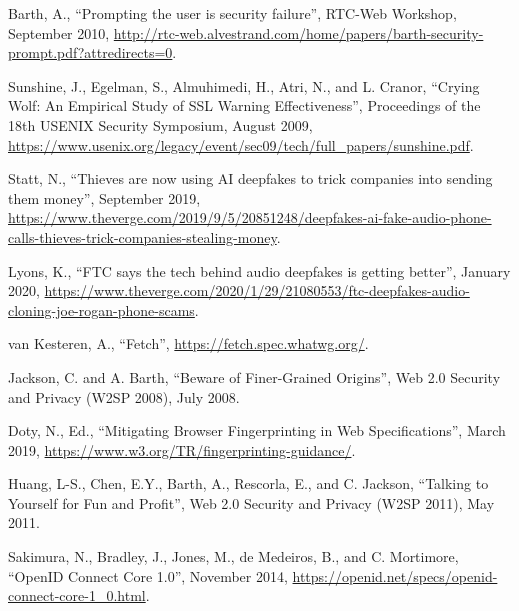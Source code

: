 \documentclass{article}
\begin{document}
\begin{description}[style=nextline, labelwidth=10em, leftmargin=10em]
\item[{[abarth-rtcweb]}] Barth, A., ``Prompting the user is security failure'', RTC-Web
   Workshop, September 2010,
   \url{http://rtc-web.alvestrand.com/home/papers/barth-security-prompt.pdf?attredirects=0}.

\item[{[cranor-wolf]}] Sunshine, J., Egelman, S., Almuhimedi, H., Atri, N., and
   L. Cranor, ``Crying Wolf: An Empirical Study of SSL Warning
   Effectiveness'', Proceedings of the 18th USENIX Security
   Symposium, August 2009,
   \url{https://www.usenix.org/legacy/event/sec09/tech/full_papers/sunshine.pdf}.

\item[{[deepfakes-fraud]}] Statt, N., ``Thieves are now using AI deepfakes to trick
   companies into sending them money'', September 2019,
   \url{https://www.theverge.com/2019/9/5/20851248/deepfakes-ai-fake-audio-phone-calls-thieves-trick-companies-stealing-money}.

\item[{[deepfakes-ftc]}] Lyons, K., ``FTC says the tech behind audio deepfakes is
   getting better'', January 2020,
   \url{https://www.theverge.com/2020/1/29/21080553/ftc-deepfakes-audio-cloning-joe-rogan-phone-scams}.

\item[{[fetch]}] van Kesteren, A., ``Fetch'',
   \url{https://fetch.spec.whatwg.org/}.

\item[{[finer-grained]}] Jackson, C. and A. Barth, ``Beware of Finer-Grained
   Origins'', Web 2.0 Security and Privacy (W2SP 2008), July
   2008.

\item[{[Fingerprinting]}] Doty, N., Ed., ``Mitigating Browser Fingerprinting in Web
   Specifications'', March 2019,
   \url{https://www.w3.org/TR/fingerprinting-guidance/}.

\item[{[huang-w2sp]}] Huang, L-S., Chen, E.Y., Barth, A., Rescorla, E., and C.
   Jackson, ``Talking to Yourself for Fun and Profit'', Web 2.0
   Security and Privacy (W2SP 2011), May 2011.

\item[{[OpenID]}] Sakimura, N., Bradley, J., Jones, M., de Medeiros, B., and
   C. Mortimore, ``OpenID Connect Core 1.0'', November 2014,
   \url{https://openid.net/specs/openid-connect-core-1_0.html}.


\end{description}
\end{document}

